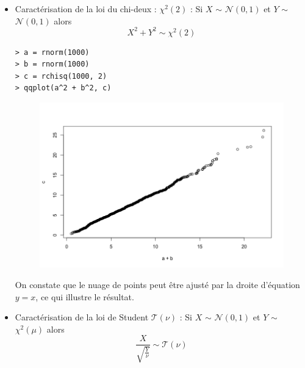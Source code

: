\varepsilon



\begin{itemize}
  \item Caractérisation de la loi du chi-deux : $\chi^{2}(2)$ :\newline
  Si $X$ $\sim$ $\mathcal{N}(0,1)$ et $Y$ $\sim$ $\mathcal{N}(0,1)$ alors 
$$X^{2} + Y^{2} \sim \chi^{2}(2)$$
\begin{lstlisting}[language=html]
> a = rnorm(1000)
> b = rnorm(1000)
> c = rchisq(1000, 2)
> qqplot(a^2 + b^2, c)
\end{lstlisting}
\begin{figure}[H]\begin{center}\includegraphics[scale=1]{ilu/adeq25.png}\end{center}\end{figure}
On constate que le nuage de points peut être ajusté par la droite d’équation$y = x$, ce qui illustre
le résultat.

\item Caractérisation de la loi de Student $\mathcal{T}(\nu)$ : \newline
Si $X$ $\sim$ $\mathcal{N}(0,1)$ et $Y$ $\sim$ $\chi^{2}(\mu)$ alors 
$$\frac{X}{\sqrt{\frac{Y}{\nu}}} \sim \mathcal{T}(\nu)$$


\end{itemize}
